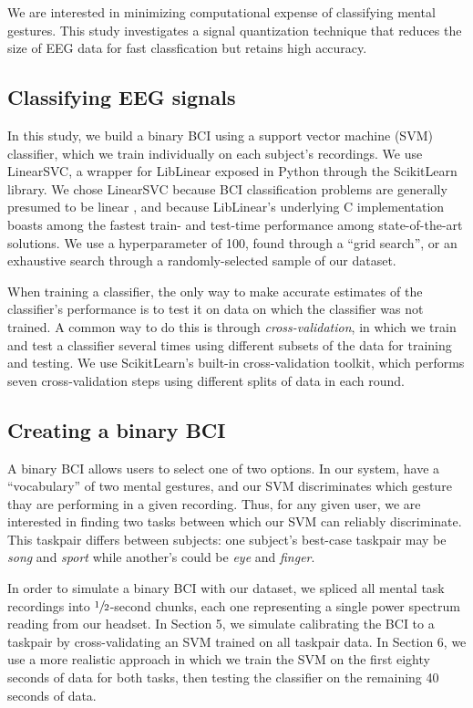 We are interested in minimizing computational expense of classifying mental gestures. This study investigates a signal quantization technique that reduces the size of EEG data for fast classfication but retains high accuracy.

\subsection{Classifying EEG signals}

In this study, we build a binary BCI using a support vector machine (SVM) classifier, which we train individually on each subject's recordings. We use LinearSVC, \cite{fan_liblinear:_2008} a wrapper for LibLinear exposed in Python through the ScikitLearn library. \cite{pedregosa_scikit-learn:_2011} We chose LinearSVC because BCI classification problems are generally presumed to be linear  \cite{garrett_comparison_2003,lotte_review_2007}, and because LibLinear's underlying C implementation boasts among the fastest train- and test-time performance among state-of-the-art solutions. \cite{fan_liblinear:_2008} We use a hyperparameter of 100, found through a ``grid search'', or an exhaustive search through a randomly-selected sample of our dataset. 

When training a classifier, the only way to make accurate estimates of the classifier's performance is to test it on data on which the classifier was not trained. A common way to do this is through \textit{cross-validation}, in which we train and test a classifier several times using different subsets of the data for training and testing. We use ScikitLearn's built-in cross-validation toolkit, which performs seven cross-validation steps using different splits of data in each round.

\subsection{Creating a binary BCI}

A binary BCI allows users to select one of two options. In our system, have a ``vocabulary'' of two mental gestures, and our SVM discriminates which gesture thay are performing in a given recording. Thus, for any given user, we are interested in finding two tasks between which our SVM can reliably discriminate. This taskpair differs between subjects: one subject's best-case taskpair may be \textit{song} and \textit{sport} while another's could be \textit{eye} and \textit{finger}. 

In order to simulate a binary BCI with our dataset, we spliced all mental task recordings into $\sfrac{1}{2}$-second chunks, each one representing a single power spectrum reading from our headset. In Section 5, we simulate calibrating the BCI to a taskpair by cross-validating an SVM trained on all taskpair data. In Section 6, we use a more realistic approach in which we train the SVM on the first eighty seconds of data for both tasks, then testing the classifier on the remaining 40 seconds of data.